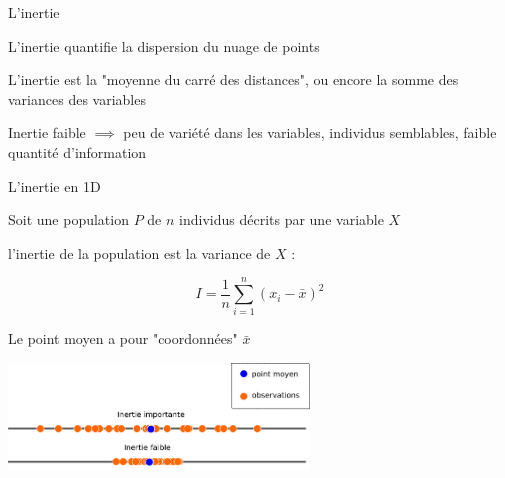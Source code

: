 \documentclass{beamer}
\begin{document}
\begin{frame}{L'inertie}

L'inertie quantifie la \alert{dispersion} du nuage de points

L'inertie est la "moyenne du carré des distances", ou encore la \alert{somme des variances} des variables

Inertie faible $\implies$ peu de variété dans les variables, individus semblables, faible quantité d'information
\end{frame}


\begin{frame}{L'inertie en 1D}


Soit une population $P$ de $n$ individus décrits par une variable $X$

l'inertie de la population est la \alert{variance} de $X$ : 

$$I= \frac{1}{n}\sum_{i=1}^n (x_i-\bar{x})^2$$

Le point moyen a pour "coordonnées" $\bar{x}$

\vspace{0.5cm}

\begin{center}
\colorbox{white}{\includegraphics[width=0.6\textwidth,keepaspectratio]{img/inertie_1D.png}}
\end{center}


\end{frame}
\end{document}

